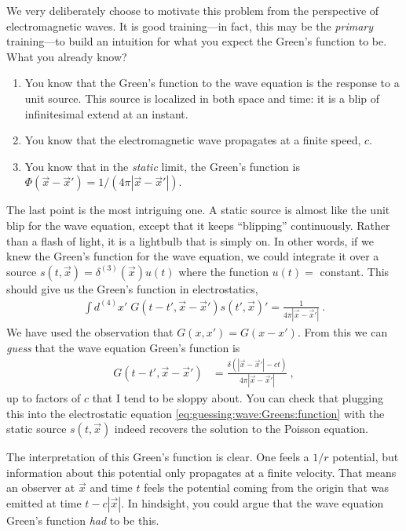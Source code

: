 \documentclass[
  11pt,
	colorful,
	raggedright,
]{tufte-style-thesis-flip}
\begin{document}
We very deliberately choose to motivate this problem from the perspective of electromagnetic waves. It is good training---in fact, this may be the \emph{primary} training---to build an intuition for what you expect the Green's function to be. What you already know?
\begin{enumerate}
  \item You know that the Green's function to the wave equation is the response to a unit source. This source is localized in both space and time: it is a blip of infinitesimal extend at an instant. 
  \item You know that the electromagnetic wave propagates at a finite speed, $c$. 
  \item You know that in the \emph{static} limit, the Green's function is $\Phi(\vec{x}-\vec{x}')= 1/(4\pi |\vec{x}-\vec{x}'|)$. 
\end{enumerate}
The last point is the most intriguing one. A static source is almost like the unit blip for the wave equation, except that it keeps ``blipping'' continuously. Rather than a flash of light, it is a lightbulb that is simply on. In other words, if we knew the Green's function for the wave equation, we could integrate it over a source $s(t,\vec{x}) = \delta^{(3)}(\vec{x}) u(t)$ where the function $u(t) =$ constant. This should give us the Green's function in electrostatics,
\begin{align}
  \int d^{(4)}x'\; G(t-t',\vec{x}-\vec{x}') s(t', \vec{x})' = \frac{1}{4\pi |\vec{x}-\vec{x}'|} \ . 
  \label{eq:guessing:wave:Greens:function}
\end{align}
We have used the observation that $G(x,x') = G(x-x')$. 
From this we can \emph{guess} that the wave equation Green's function is
\begin{align}
  G(t-t',\vec{x}-\vec{x}') &= 
  \frac{\delta(|\vec{x}-\vec{x}'|-ct)}{4\pi |\vec{x}-\vec{x}'|} \ ,
\end{align}
up to factors of $c$ that I tend to be sloppy about. You can check that plugging this into the electrostatic equation \eqref{eq:guessing:wave:Greens:function} with the static source $s(t,\vec{x})$ indeed recovers the solution to the Poisson equation. 

The interpretation of this Green's function is clear. One feels a $1/r$ potential, but information about this potential only propagates at a finite velocity. That means an observer at $\vec{x}$ and time $t$ feels the potential coming from the origin that was emitted at time $t-c|\vec{x}|$. In hindsight, you could argue that the wave equation Green's function \emph{had} to be this.  
\end{document}
